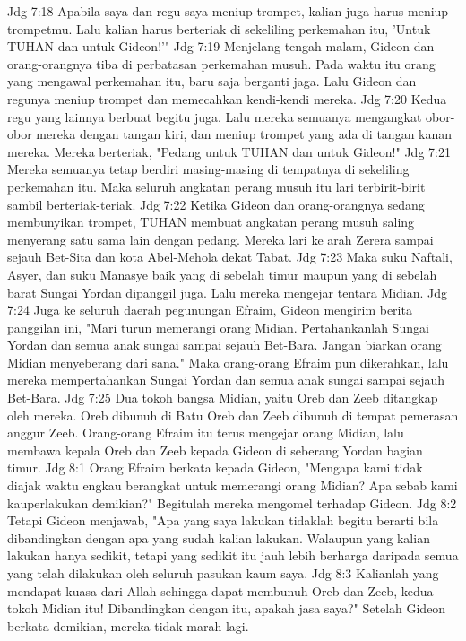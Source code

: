 Jdg 7:18  Apabila saya dan regu saya meniup trompet, kalian juga harus meniup trompetmu. Lalu kalian harus berteriak di sekeliling perkemahan itu, 'Untuk TUHAN dan untuk Gideon!'"
Jdg 7:19  Menjelang tengah malam, Gideon dan orang-orangnya tiba di perbatasan perkemahan musuh. Pada waktu itu orang yang mengawal perkemahan itu, baru saja berganti jaga. Lalu Gideon dan regunya meniup trompet dan memecahkan kendi-kendi mereka.
Jdg 7:20  Kedua regu yang lainnya berbuat begitu juga. Lalu mereka semuanya mengangkat obor-obor mereka dengan tangan kiri, dan meniup trompet yang ada di tangan kanan mereka. Mereka berteriak, "Pedang untuk TUHAN dan untuk Gideon!"
Jdg 7:21  Mereka semuanya tetap berdiri masing-masing di tempatnya di sekeliling perkemahan itu. Maka seluruh angkatan perang musuh itu lari terbirit-birit sambil berteriak-teriak.
Jdg 7:22  Ketika Gideon dan orang-orangnya sedang membunyikan trompet, TUHAN membuat angkatan perang musuh saling menyerang satu sama lain dengan pedang. Mereka lari ke arah Zerera sampai sejauh Bet-Sita dan kota Abel-Mehola dekat Tabat.
Jdg 7:23  Maka suku Naftali, Asyer, dan suku Manasye baik yang di sebelah timur maupun yang di sebelah barat Sungai Yordan dipanggil juga. Lalu mereka mengejar tentara Midian.
Jdg 7:24  Juga ke seluruh daerah pegunungan Efraim, Gideon mengirim berita panggilan ini, "Mari turun memerangi orang Midian. Pertahankanlah Sungai Yordan dan semua anak sungai sampai sejauh Bet-Bara. Jangan biarkan orang Midian menyeberang dari sana." Maka orang-orang Efraim pun dikerahkan, lalu mereka mempertahankan Sungai Yordan dan semua anak sungai sampai sejauh Bet-Bara.
Jdg 7:25  Dua tokoh bangsa Midian, yaitu Oreb dan Zeeb ditangkap oleh mereka. Oreb dibunuh di Batu Oreb dan Zeeb dibunuh di tempat pemerasan anggur Zeeb. Orang-orang Efraim itu terus mengejar orang Midian, lalu membawa kepala Oreb dan Zeeb kepada Gideon di seberang Yordan bagian timur.
Jdg 8:1  Orang Efraim berkata kepada Gideon, "Mengapa kami tidak diajak waktu engkau berangkat untuk memerangi orang Midian? Apa sebab kami kauperlakukan demikian?" Begitulah mereka mengomel terhadap Gideon.
Jdg 8:2  Tetapi Gideon menjawab, "Apa yang saya lakukan tidaklah begitu berarti bila dibandingkan dengan apa yang sudah kalian lakukan. Walaupun yang kalian lakukan hanya sedikit, tetapi yang sedikit itu jauh lebih berharga daripada semua yang telah dilakukan oleh seluruh pasukan kaum saya.
Jdg 8:3  Kalianlah yang mendapat kuasa dari Allah sehingga dapat membunuh Oreb dan Zeeb, kedua tokoh Midian itu! Dibandingkan dengan itu, apakah jasa saya?" Setelah Gideon berkata demikian, mereka tidak marah lagi.
